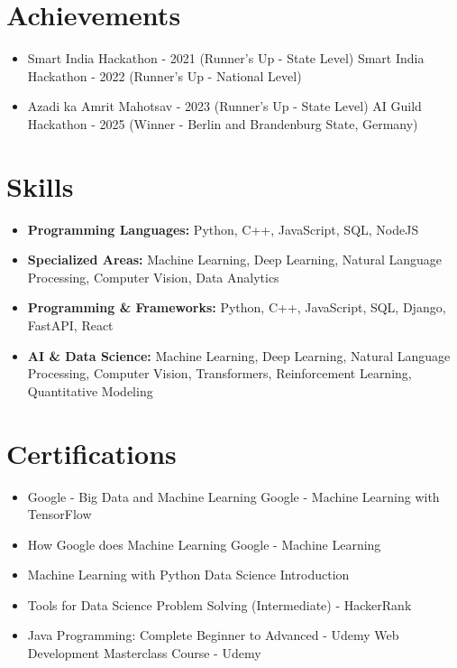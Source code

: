 \documentclass[a4paper,10pt]{article}
\begin{document}
\section*{Achievements}
\begin{itemize}
\item Smart India Hackathon - 2021 (Runner's Up - State Level) \hfill Smart India Hackathon - 2022 (Runner's Up - National Level)
\item Azadi ka Amrit Mahotsav - 2023 (Runner's Up - State Level) \hfill AI Guild Hackathon - 2025 (Winner - Berlin and Brandenburg State, Germany)
\end{itemize}

\section*{Skills}
\begin{itemize}
  \item \textbf{Programming Languages:} Python, C++, JavaScript, SQL, NodeJS
  \item \textbf{Specialized Areas:} Machine Learning, Deep Learning, Natural Language Processing, Computer Vision, Data Analytics
  \item \textbf{Programming \& Frameworks:} Python, C++, JavaScript, SQL, Django, FastAPI, React
  \item \textbf{AI \& Data Science:} Machine Learning, Deep Learning, Natural Language Processing, Computer Vision, Transformers, Reinforcement Learning, Quantitative Modeling
\end{itemize}

\section*{Certifications}
\begin{itemize}
\item Google - Big Data and Machine Learning \hfill Google - Machine Learning with TensorFlow
\item How Google does Machine Learning \hfill Google - Machine Learning
\item Machine Learning with Python \hfill Data Science Introduction
\item Tools for Data Science \hfill Problem Solving (Intermediate) - HackerRank
\item Java Programming: Complete Beginner to Advanced - Udemy \hfill Web Development Masterclass Course - Udemy
\end{itemize}
\end{document}
